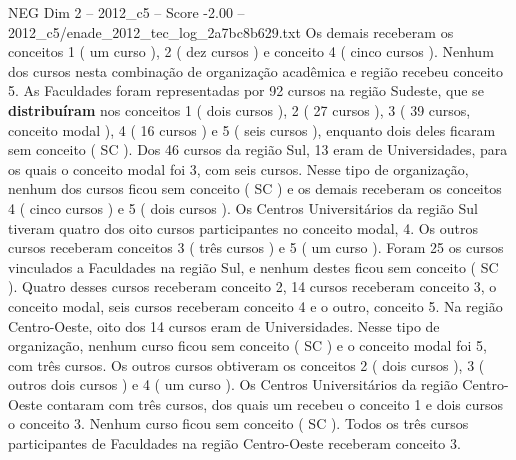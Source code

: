 \begin{textsample}{NEG Dim 2 – 2012\_c5 – Score -2.00 – 2012\_c5/enade\_2012\_tec\_log\_2a7bc8b629.txt}
Os demais receberam os conceitos 1 ( um curso ), 2 ( dez cursos ) e conceito 4 ( cinco cursos ).
Nenhum dos cursos nesta combinação de organização acadêmica e região recebeu conceito 5.
As Faculdades foram representadas por 92 cursos na região Sudeste, que se \textbf{distribuíram} nos conceitos 1 ( dois cursos ), 2 ( 27 cursos ), 3 ( 39 cursos, conceito modal ), 4 ( 16 cursos ) e 5 ( seis cursos ), enquanto dois deles ficaram sem conceito ( SC ).
Dos 46 cursos da região Sul, 13 eram de Universidades, para os quais o conceito modal foi 3, com seis cursos.
Nesse tipo de organização, nenhum dos cursos ficou sem conceito ( SC ) e os demais receberam os conceitos 4 ( cinco cursos ) e 5 ( dois cursos ).
Os Centros Universitários da região Sul tiveram quatro dos oito cursos participantes no conceito modal, 4.
Os outros cursos receberam conceitos 3 ( três cursos ) e 5 ( um curso ).
Foram 25 os cursos vinculados a Faculdades na região Sul, e nenhum destes ficou sem conceito ( SC ).
Quatro desses cursos receberam conceito 2, 14 cursos receberam conceito 3, o conceito modal, seis cursos receberam conceito 4 e o outro, conceito 5.
Na região Centro-Oeste, oito dos 14 cursos eram de Universidades.
Nesse tipo de organização, nenhum curso ficou sem conceito ( SC ) e o conceito modal foi 5, com três cursos.
Os outros cursos obtiveram os conceitos 2 ( dois cursos ), 3 ( outros dois cursos ) e 4 ( um curso ).
Os Centros Universitários da região Centro-Oeste contaram com três cursos, dos quais um recebeu o conceito 1 e dois cursos o conceito 3.
Nenhum curso ficou sem conceito ( SC ).
Todos os três cursos participantes de Faculdades na região Centro-Oeste receberam conceito 3.

\end{textsample}
